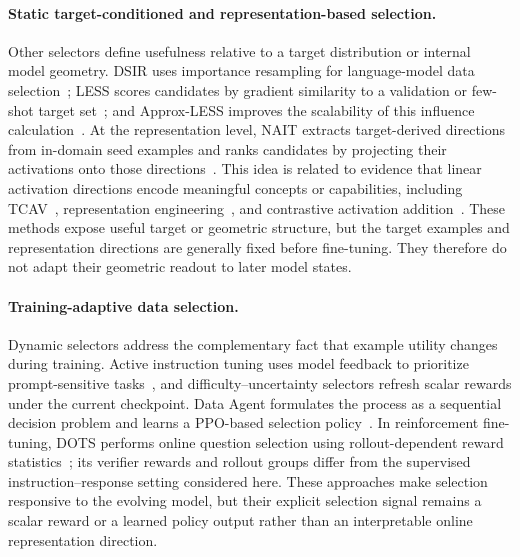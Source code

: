 \paragraph{Static target-conditioned and representation-based
selection.}
Other selectors define usefulness relative to a target distribution
or internal model geometry. DSIR uses importance resampling for
language-model data selection~\cite{dsir}; LESS scores candidates by
gradient similarity to a validation or few-shot target
set~\cite{less}; and Approx-LESS improves the scalability of this
influence calculation~\cite{approxless}. At the representation level,
NAIT extracts target-derived directions from in-domain seed examples
and ranks candidates by projecting their activations onto those
directions~\cite{nait2026}. This idea is related to evidence that
linear activation directions encode meaningful concepts or
capabilities, including TCAV~\cite{tcav}, representation
engineering~\cite{repe}, and contrastive activation
addition~\cite{caa}. These methods expose useful target or geometric
structure, but the target examples and representation directions are
generally fixed before fine-tuning. They therefore do not adapt their
geometric readout to later model states.

\paragraph{Training-adaptive data selection.}
Dynamic selectors address the complementary fact that example utility
changes during training. Active instruction tuning uses model
feedback to prioritize prompt-sensitive tasks~\cite{kung2023activeit},
and difficulty--uncertainty selectors refresh scalar rewards under
the current checkpoint. Data Agent formulates the process as a
sequential decision problem and learns a PPO-based selection
policy~\cite{dataagent}. In reinforcement fine-tuning, DOTS performs
online question selection using rollout-dependent reward
statistics~\cite{sun2025dots}; its verifier rewards and rollout groups
differ from the supervised instruction--response setting considered
here. These approaches make selection responsive to the evolving
model, but their explicit selection signal remains a scalar reward or
a learned policy output rather than an interpretable online
representation direction.

